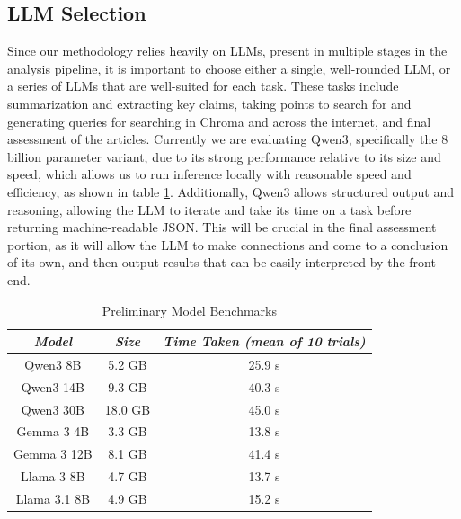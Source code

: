 \documentclass[conference]{IEEEtran}
\begin{document}
\subsection{LLM Selection}
Since our methodology relies heavily on LLMs, present in multiple stages in the analysis pipeline, it is important to choose either a single, well-rounded LLM, or a series of LLMs that are well-suited for each task. These tasks include summarization and extracting key claims, taking points to search for and generating queries for searching in Chroma and across the internet, and final assessment of the articles. Currently we are evaluating Qwen3\cite{qwen3}, specifically the 8 billion parameter variant, due to its strong performance relative to its size and speed, which allows us to run inference locally with reasonable speed and efficiency, as shown in table \ref{tab:modelBenchmarks}. Additionally, Qwen3 allows structured output and reasoning, allowing the LLM to iterate and take its time on a task before returning machine-readable JSON. This will be crucial in the final assessment portion, as it will allow the LLM to make connections and come to a conclusion of its own, and then output results that can be easily interpreted by the front-end.
\begin{table}[ht]
    \centering
    \caption{Preliminary Model Benchmarks}
    \begin{tabular}{|c|c|c|}
        \hline
        \textbf{\textit{Model}} & \textbf{\textit{Size}} & \textbf{\textit{Time Taken (mean of 10 trials)}} \\ \hline
        Qwen3 8B & 5.2 GB & 25.9 s \\ \hline
        Qwen3 14B & 9.3 GB & 40.3 s \\ \hline
        Qwen3 30B & 18.0 GB & 45.0 s \\ \hline
        Gemma 3 4B & 3.3 GB & 13.8 s \\ \hline
        Gemma 3 12B & 8.1 GB & 41.4 s \\ \hline
        Llama 3 8B & 4.7 GB & 13.7 s \\ \hline
        Llama 3.1 8B & 4.9 GB & 15.2 s \\ \hline
    \end{tabular}
    \label{tab:modelBenchmarks}
\end{table}
\end{document}
